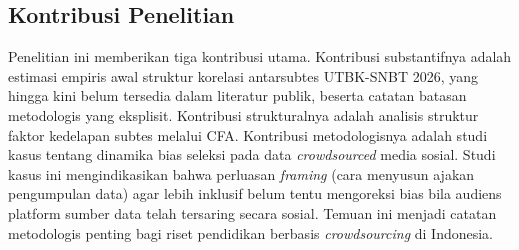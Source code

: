 \subsection{Kontribusi Penelitian}
Penelitian ini memberikan tiga kontribusi utama. Kontribusi substantifnya adalah estimasi empiris awal struktur korelasi antarsubtes UTBK-SNBT 2026, yang hingga kini belum tersedia dalam literatur publik, beserta catatan batasan metodologis yang eksplisit. Kontribusi strukturalnya adalah analisis struktur faktor kedelapan subtes melalui CFA. Kontribusi metodologisnya adalah studi kasus tentang dinamika bias seleksi pada data \textit{crowdsourced} media sosial. Studi kasus ini mengindikasikan bahwa perluasan \textit{framing} (cara menyusun ajakan pengumpulan data) agar lebih inklusif belum tentu mengoreksi bias bila audiens platform sumber data telah tersaring secara sosial. Temuan ini menjadi catatan metodologis penting bagi riset pendidikan berbasis \textit{crowdsourcing} di Indonesia.